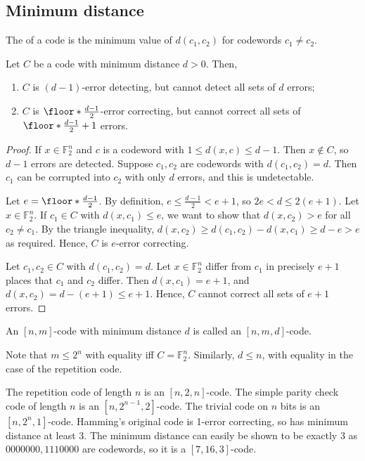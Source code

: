 \subsection{Minimum distance}
\begin{definition}
    The  of a code is the minimum value of $d(c_1, c_2)$ for codewords $c_1 \neq c_2$.
\end{definition}
\begin{lemma}
    Let $C$ be a code with minimum distance $d > 0$.
    Then,
    \begin{enumerate}
        \item $C$ is $(d-1)$-error detecting, but cannot detect all sets of $d$ errors;
        \item $C$ is $\floor*{\frac{d-1}{2}}$-error correcting, but cannot correct all sets of $\floor*{\frac{d-1}{2}} + 1$ errors.
    \end{enumerate}
\end{lemma}
\begin{proof}
    If $x \in \mathbb F_2^n$ and $c$ is a codeword with $1 \leq d(x,c) \leq d - 1$.
    Then $x \not\in C$, so $d - 1$ errors are detected.
    Suppose $c_1, c_2$ are codewords with $d(c_1, c_2) = d$.
    Then $c_1$ can be corrupted into $c_2$ with only $d$ errors, and this is undetectable.

    Let $e = \floor*{\frac{d-1}{2}}$.
    By definition, $e \leq \frac{d-1}{2} < e + 1$, so $2e < d \leq 2(e+1)$.
    Let $x \in \mathbb F_2^n$.
    If $c_1 \in C$ with $d(x,c_1) \leq e$, we want to show that $d(x,c_2) > e$ for all $c_2 \neq c_1$.
    By the triangle inequality, $d(x,c_2) \geq d(c_1,c_2) - d(x,c_1) \geq d - e > e$ as required.
    Hence, $C$ is $e$-error correcting.

    Let $c_1, c_2 \in C$ with $d(c_1, c_2) = d$.
    Let $x \in \mathbb F_2^n$ differ from $c_1$ in precisely $e + 1$ places that $c_1$ and $c_2$ differ.
    Then $d(x,c_1) = e + 1$, and $d(x,c_2) = d - (e+1) \leq e + 1$.
    Hence, $C$ cannot correct all sets of $e + 1$ errors.
\end{proof}
\begin{definition}
    An $[n,m]$-code with minimum distance $d$ is called an $[n,m,d]$-code.
\end{definition}
Note that $m \leq 2^n$ with equality iff $C = \mathbb F_2^n$.
Similarly, $d \leq n$, with equality in the case of the repetition code.
\begin{example}
    The repetition code of length $n$ is an $[n,2,n]$-code.
    The simple parity check code of length $n$ is an $[n,2^{n-1},2]$-code.
    The trivial code on $n$ bits is an $[n,2^n,1]$-code.
    Hamming's original code is 1-error correcting, so has minimum distance at least 3.
    The minimum distance can easily be shown to be exactly 3 as $0000000, 1110000$ are codewords, so it is a $[7,16,3]$-code.
\end{example}

